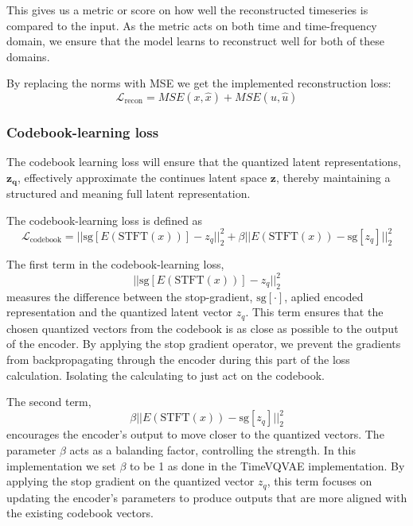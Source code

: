 This gives us a metric or score on how well the reconstructed timeseries is compared to the input. As the metric acts on both time and time-frequency domain, we ensure that the 
model learns to reconstruct well for both of these domains.

By replacing the norms with MSE we get the implemented reconstruction loss:
\begin{equation}
    \mathcal{L}_{\text{recon}} = MSE(x,\hat{x}) + MSE(u, \hat{u})
    \label{eq:recon}
\end{equation}

\subsubsection{Codebook-learning loss}
The codebook learning loss will ensure that the quantized latent representations, $\mathbf{z_q}$, effectively approximate the continues latent space $\mathbf{z}$, thereby maintaining a structured and meaning full latent representation. 

The codebook-learning loss is defined as
\begin{equation}
    \mathcal{L}_\text{codebook} = ||\text{sg}\left[ E(\text{STFT}(x))\right] - z_q||_2^2 + \beta|| E(\text{STFT}(x)) - \text{sg}\left[ z_q \right]||_2^2
    \label{eq:codebook}
\end{equation}

The first term in the codebook-learning loss,
\begin{equation}
    ||\text{sg}\left[ E(\text{STFT}(x))\right] - z_q||_2^2
\end{equation}
measures the difference between the stop-gradient, $\text{sg}\left[\cdot\right]$, aplied encoded representation and the quantized latent vector $z_q$. This term ensures that the chosen quantized vectors from the codebook is as close as possible to the output of the encoder. By applying the stop gradient operator, we prevent the gradients from backpropagating through the encoder during this part of the loss calculation.
Isolating the calculating to just act on the codebook.

The second term,
\begin{equation}
    \beta|| E(\text{STFT}(x)) - \text{sg}\left[ z_q \right]||_2^2
\end{equation}
encourages the encoder's output to move closer to the quantized vectors. The parameter $\beta$ acts as a balanding factor, controlling the strength. In this implementation we set $\beta$ to be 1 as done in the TimeVQVAE implementation.
By applying the stop gradient on the quantized vector $z_q$, this term focuses on updating the encoder's parameters to produce outputs that are more aligned with the existing
codebook vectors.

